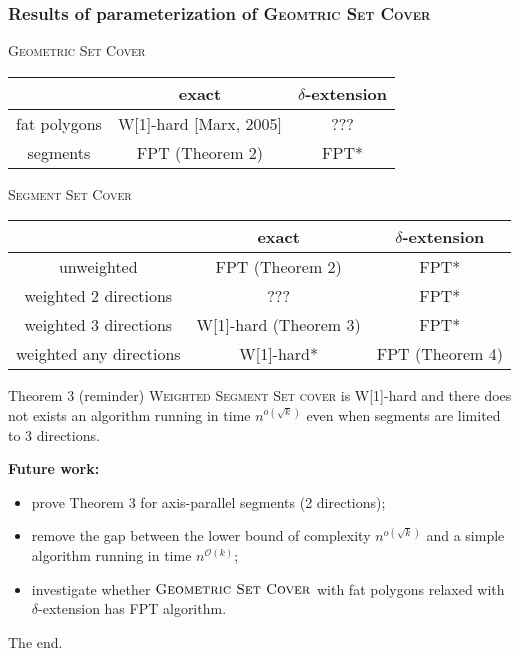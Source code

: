\documentclass{beamer}
\begin{document}
\begin{frame}
\frametitle{Results of parameterization of \textsc{Geomtric Set Cover}}


\textsc{Geometric Set Cover}
\begin{tabular}{|c|c|c|}
\hline
           & exact & $\delta$-extension \\
\hline
fat polygons & W[1]-hard [Marx, 2005] & ??? \\
\hline
segments &  \textcolor{olivegreen}{FPT (Theorem 2)} & \textcolor{olivegreen}{FPT*} \\
\hline
\end{tabular}

\bigskip

\textsc{Segment Set Cover}
\begin{tabular}{|c|c|c|}
\hline
           & exact & $\delta$-extension \\
\hline
unweighted & \textcolor{olivegreen}{FPT (Theorem 2)} & \textcolor{olivegreen}{FPT*} \\
\hline
weighted 2 directions & ??? & \textcolor{olivegreen}{FPT*} \\
\hline
weighted 3 directions & \textcolor{olivegreen}{W[1]-hard (Theorem 3)} &  \textcolor{olivegreen}{FPT*}\\
\hline
weighted any directions & \textcolor{olivegreen}{W[1]-hard*} &  \textcolor{olivegreen}{FPT (Theorem 4)}\\
\hline
\end{tabular}

\end{frame}


\begin{frame}
\begin{block}{Theorem 3 (reminder)}
	\textsc{Weighted Segment Set cover} is W[1]-hard
	and there does not exists an algorithm running in time $n^{o(\sqrt{k})}$
	even when segments are limited to 3 directions.
\end{block}
\bigskip

\textbf{Future work:}
\begin{itemize}
\item prove Theorem 3 for axis-parallel segments (2 directions);
\item remove the gap between the lower bound of complexity $n^{o(\sqrt{k})}$
and a simple algorithm running in time $n^{\mathcal{O}(k)}$;
\item investigate whether $\textsc{Geometric Set Cover}$ 
with fat polygons relaxed with $\delta$-extension has FPT algorithm.
\end{itemize}
\end{frame}

\begin{frame}
\begin{center}
The end.
\end{center}
\end{frame}

\end{document}
